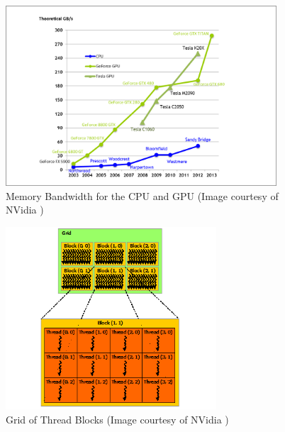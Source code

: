 \begin{figure}
\centering
\includegraphics[width=0.9\textwidth]{gpu_content/nvidia_figures/memory-bandwidth.png}
\caption{Memory Bandwidth for the CPU and GPU (Image courtesy of NVidia \cite{CudaGuide2013})} 
\label{fig:memory-bandwidth}
\end{figure}

\begin{figure}
\centering
\includegraphics[width=0.7\textwidth]{gpu_content/nvidia_figures/grid-of-thread-blocks.png}
\caption{Grid of Thread Blocks (Image courtesy of NVidia \cite{CudaGuide2013})} 
\label{fig:grid-of-thread-blocks}
\end{figure}
